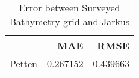 \begin{table}[h!]
\caption{Error between Surveyed Bathymetry grid and Jarkus}
\label{tab:jarkus_vs_survey_error}
\begin{tabular}{lrr}
\toprule
 & MAE & RMSE \\
\midrule
Petten & 0.267152 & 0.439663 \\
\bottomrule
\end{tabular}
\end{table}
